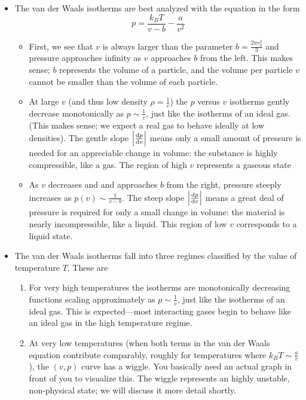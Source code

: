 \documentclass[11pt, a4paper]{article}
\begin{document}
\begin{itemize}
	\item The van der Waals isotherms are best analyzed with the equation in the form
	\begin{equation*}
		p = \frac{k_{B}T}{v-b} - \frac{a}{v^{2}}
	\end{equation*}
	\begin{itemize}
		\item First, we see that $ v $ is always larger than the parameter $ b = \frac{2\pi r_{0}^{3}}{3} $ and pressure approaches infinity as $ v $ approaches $ b $ from the left. This makes sense; $ b $ represents the volume of a particle, and the volume per particle $ v $ cannot be smaller than the volume of each particle.
			
		\item At large $ v $ (and thus low density $ \rho = \frac{1}{v} $) the $ p $ versus $ v $ isotherms gently decrease monotonically as $ p \sim \frac{1}{v} $, just like the isotherms of an ideal gas. (This makes sense; we expect a real gas to behave ideally at low densities). The gentle slope $ \abs{\dv{p}{v}} $ means only a small amount of pressure is needed for an appreciable change in volume: the substance is highly compressible, like a gas. The region of high $ v $ represents a gaseous state
			
		\item As $ v $ decreases and and approaches $ b $ from the right, pressure steeply increases as $ p(v) \sim \frac{1}{v - b} $. The steep slope $ \abs{\dv{p}{v}} $ means a great deal of pressure is required for only a small change in volume: the material is nearly incompressible, like a liquid. This region of low $ v $ corresponds to a liquid state.
			
	\end{itemize}

	\item The van der Waals isotherms fall into three regimes classified by the value of temperature $ T $. These are
	\begin{enumerate}
		\item For very high temperatures the isotherms are monotonically decreasing functions scaling approximately as $ p \sim \frac{1}{v} $, just like the isotherms of an ideal gas. This is expected---most interacting gases begin to behave like an ideal gas in the high temperature regime.
				
		\item At very low temperatures (when both terms in the van der Waals equation contribute comparably, roughly for temperatures where $ k_{B}T \sim \frac{a}{v} $), the $ (v, p) $ curve has a wiggle. You basically need an actual graph in front of you to visualize this. The wiggle represents an highly unstable, non-physical state; we will discuss it more detail shortly.
				

\end{enumerate}
\end{itemize}
\end{document}
